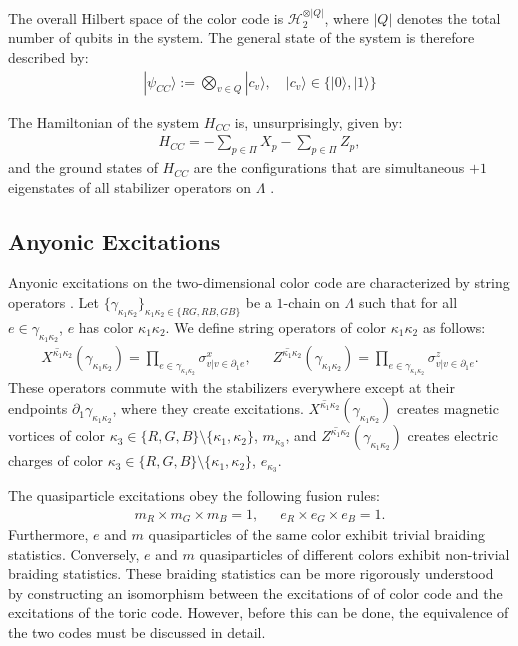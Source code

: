 \documentclass[12pt]{article}
\theoremstyle{definition}
\begin{document}
The overall Hilbert space of the color code is $\mathcal{H}^{\otimes |Q|}_2$, where $|Q|$ denotes the total number of qubits in the system. The general state of the system is therefore described by:
    \begin{align}
        |\psi_{CC}\rangle :=\bigotimes_{v\in Q}|c_v\rangle,\enspace\enspace |c_v\rangle\in \{|0\rangle,|1\rangle\}
    \end{align}

The Hamiltonian of the system $H_{CC}$ is, unsurprisingly, given by:
    \begin{align}
        H_{CC} = -\sum_{p\in\Pi}X_p-\sum_{p\in\Pi}Z_p,
    \end{align}
and the ground states of $H_{CC}$ are the configurations that are simultaneous $+1$ eigenstates of all stabilizer operators on $\Lambda$ \cite{kubica2015}.

\subsection{Anyonic Excitations}
Anyonic excitations on the two-dimensional color code are characterized by string operators \cite{yoshida2015}. Let $\{\gamma_{\kappa_1\kappa_2}\}_{\kappa_1\kappa_2\in\{RG,RB,GB\}}$ be a $1$-chain on $\Lambda$ such that for all $e\in\gamma_{\kappa_1\kappa_2}$, $e$ has color $\kappa_1\kappa_2$. We define string operators of color $\kappa_1\kappa_2$ as follows:
    \begin{align}
        \overline{X^{\kappa_1\kappa_2}}(\gamma_{\kappa_1\kappa_2}) = \prod_{e\in\gamma_{\kappa_1\kappa_2}}\sigma^x_{v|v\in\partial_1e},\enspace\enspace\enspace\overline{Z^{\kappa_1\kappa_2}}(\gamma_{\kappa_1\kappa_2}) = \prod_{e\in\gamma_{\kappa_1\kappa_2}}\sigma^z_{v|v\in\partial_1e}.
    \end{align}
These operators commute with the stabilizers everywhere except at their endpoints $\partial_1\gamma_{\kappa_1\kappa_2}$, where they create excitations. $\overline{X^{\kappa_1\kappa_2}}(\gamma_{\kappa_1\kappa_2})$ creates magnetic vortices of color $\kappa_3\in\{R,G,B\}\setminus\{\kappa_1,\kappa_2\}$, $m_{\kappa_3}$, and $\overline{Z^{\kappa_1\kappa_2}}(\gamma_{\kappa_1\kappa_2})$ creates electric charges of color $\kappa_3\in\{R,G,B\}\setminus\{\kappa_1,\kappa_2\}$, $e_{\kappa_3}$.\newline

The quasiparticle excitations obey the following fusion rules:
    \begin{align}
        m_R\times m_G\times m_B = 1,\enspace\enspace\enspace e_R\times e_G\times e_B = 1.
    \end{align}
Furthermore, $e$ and $m$ quasiparticles of the same color exhibit trivial braiding statistics. Conversely, $e $ and $m$ quasiparticles of different colors exhibit non-trivial braiding statistics. These braiding statistics can be more rigorously understood by constructing an isomorphism between the excitations of of color code and the excitations of the toric code. However, before this can be done, the equivalence of the two codes must be discussed in detail.
\end{document}
